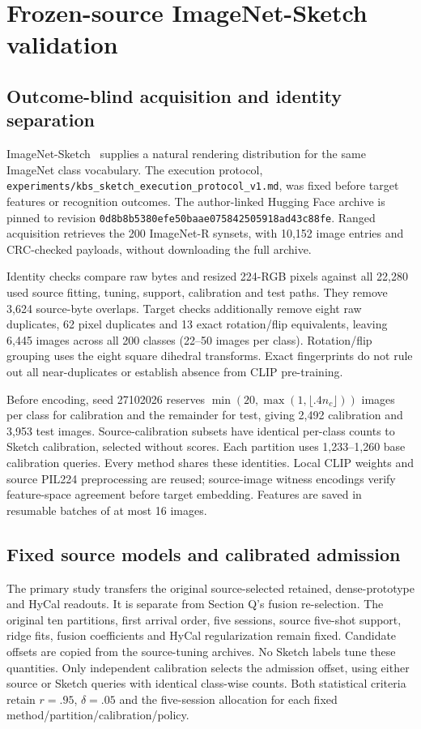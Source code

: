 \documentclass[preprint,review,12pt]{elsarticle}
\begin{document}
\FloatBarrier
\section{Frozen-source ImageNet-Sketch validation}
\label{app:sketchvalidation}
\subsection{Outcome-blind acquisition and identity separation}
ImageNet-Sketch~\cite{wang2019robustglobal} supplies a natural rendering distribution for the same ImageNet class vocabulary. The execution protocol, \nolinkurl{experiments/kbs_sketch_execution_protocol_v1.md}, was fixed before target features or recognition outcomes. The author-linked Hugging Face archive is pinned to revision \nolinkurl{0d8b8b5380efe50baae075842505918ad43c88fe}. Ranged acquisition retrieves the 200 ImageNet-R synsets, with 10,152 image entries and CRC-checked payloads, without downloading the full archive.

Identity checks compare raw bytes and resized 224-RGB pixels against all 22,280 used source fitting, tuning, support, calibration and test paths. They remove 3,624 source-byte overlaps. Target checks additionally remove eight raw duplicates, 62 pixel duplicates and 13 exact rotation/flip equivalents, leaving 6,445 images across all 200 classes (22--50 images per class). Rotation/flip grouping uses the eight square dihedral transforms. Exact fingerprints do not rule out all near-duplicates or establish absence from CLIP pre-training.

Before encoding, seed 27102026 reserves $\min(20,\max(1,\lfloor .4n_c\rfloor))$ images per class for calibration and the remainder for test, giving 2,492 calibration and 3,953 test images. Source-calibration subsets have identical per-class counts to Sketch calibration, selected without scores. Each partition uses 1,233--1,260 base calibration queries. Every method shares these identities. Local CLIP weights and source PIL224 preprocessing are reused; source-image witness encodings verify feature-space agreement before target embedding. Features are saved in resumable batches of at most 16 images.

\subsection{Fixed source models and calibrated admission}
The primary study transfers the original source-selected retained, dense-prototype and HyCal readouts. It is separate from Section Q's fusion re-selection. The original ten partitions, first arrival order, five sessions, source five-shot support, ridge fits, fusion coefficients and HyCal regularization remain fixed. Candidate offsets are copied from the source-tuning archives. No Sketch labels tune these quantities. Only independent calibration selects the admission offset, using either source or Sketch queries with identical class-wise counts. Both statistical criteria retain $r=.95$, $\delta=.05$ and the five-session allocation for each fixed method/partition/calibration/policy.
\end{document}
